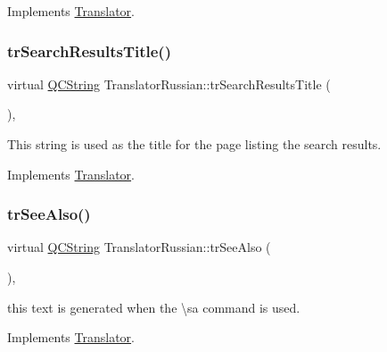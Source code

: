 Implements \mbox{\hyperlink{class_translator}{Translator}}.

\mbox{\label{class_translator_russian_ac161e6e9dc45d50e64924ef21c23f101}} 
\subsubsection{\texorpdfstring{trSearchResultsTitle()}{trSearchResultsTitle()}}
{\footnotesize\ttfamily virtual \mbox{\hyperlink{class_q_c_string}{Q\+C\+String}} Translator\+Russian\+::tr\+Search\+Results\+Title (\begin{DoxyParamCaption}{ }\end{DoxyParamCaption})\hspace{0.3cm}{\ttfamily [inline]}, {\ttfamily [virtual]}}

This string is used as the title for the page listing the search results. 

Implements \mbox{\hyperlink{class_translator}{Translator}}.

\mbox{\label{class_translator_russian_a312bcbdf20528c9f2dd5890f571b05bd}} 
\subsubsection{\texorpdfstring{trSeeAlso()}{trSeeAlso()}}
{\footnotesize\ttfamily virtual \mbox{\hyperlink{class_q_c_string}{Q\+C\+String}} Translator\+Russian\+::tr\+See\+Also (\begin{DoxyParamCaption}{ }\end{DoxyParamCaption})\hspace{0.3cm}{\ttfamily [inline]}, {\ttfamily [virtual]}}

this text is generated when the \textbackslash{}sa command is used. 

Implements \mbox{\hyperlink{class_translator}{Translator}}.

\mbox{\label{class_translator_russian_aa635f8b108971755fb412a2e42950c2d}} 
